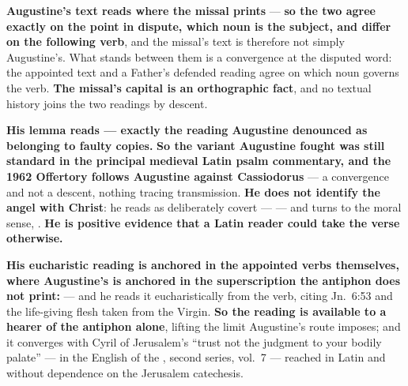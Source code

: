 \textbf{Augustine's text reads  where the missal prints
} --- \textbf{so the two agree exactly on the point in
dispute, which noun is the subject, and differ on the following verb}, and the
missal's text is therefore not simply Augustine's. What stands between them is a
convergence at the disputed word: the appointed text and a Father's defended
reading agree on which noun governs the verb. \textbf{The missal's capital
 is an orthographic fact}, and no textual history joins the two
readings by descent.

\begin{witnessnote}
\textbf{His lemma reads  --- exactly the
reading Augustine denounced as belonging to faulty copies.} \textbf{So the
variant Augustine fought was still standard in the principal medieval Latin
psalm commentary, and the 1962 Offertory follows Augustine against
Cassiodorus} --- a convergence and not a descent, nothing tracing
transmission. \textbf{He does not identify the angel with Christ}: he reads
 as deliberately covert ---  --- and turns to the moral
sense, .
\textbf{He is positive evidence that a Latin reader could take the verse
otherwise.}
\end{witnessnote}

\begin{witnessnote}
\textbf{His eucharistic reading is anchored in the
appointed verbs themselves, where Augustine's is anchored in the superscription
the antiphon does not print:}  --- and
he reads it eucharistically from the verb, citing Jn.~6:53 and the life-giving
flesh taken from the Virgin. \textbf{So the reading is available to a hearer of
the antiphon alone}, lifting the limit Augustine's route imposes; and it
converges with Cyril of Jerusalem's ``trust not the judgment to your bodily
palate'' --- in the English of the , second
series, vol.~7 --- reached in Latin and without dependence on the Jerusalem
catechesis.
\end{witnessnote}

